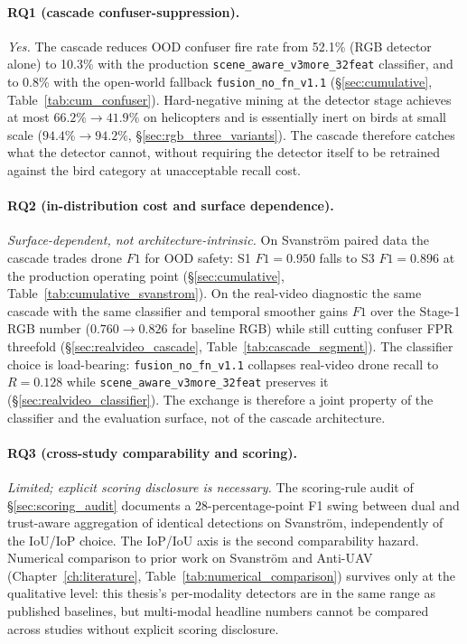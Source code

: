 \documentclass[12pt,a4paper,oneside,openright]{book}
\begin{document}
\paragraph{RQ1 (cascade confuser-suppression).}
\emph{Yes.} The cascade reduces OOD confuser fire rate from 52.1\% (RGB detector alone) to 10.3\% with the production \texttt{scene\_aware\_v3more\_32feat} classifier, and to 0.8\% with the open-world fallback \texttt{fusion\_no\_fn\_v1.1} (\S\ref{sec:cumulative}, Table~\ref{tab:cum_confuser}). Hard-negative mining at the detector stage achieves at most $66.2\% \to 41.9\%$ on helicopters and is essentially inert on birds at small scale ($94.4\% \to 94.2\%$, \S\ref{sec:rgb_three_variants}). The cascade therefore catches what the detector cannot, without requiring the detector itself to be retrained against the bird category at unacceptable recall cost.

\paragraph{RQ2 (in-distribution cost and surface dependence).}
\emph{Surface-dependent, not architecture-intrinsic.} On Svanstr\"om paired data the cascade trades drone $F1$ for OOD safety: S1 $F1=0.950$ falls to S3 $F1=0.896$ at the production operating point (\S\ref{sec:cumulative}, Table~\ref{tab:cumulative_svanstrom}). On the real-video diagnostic the same cascade with the same classifier and temporal smoother gains $F1$ over the Stage-1 RGB number ($0.760 \to 0.826$ for baseline RGB) while still cutting confuser FPR threefold (\S\ref{sec:realvideo_cascade}, Table~\ref{tab:cascade_segment}). The classifier choice is load-bearing: \texttt{fusion\_no\_fn\_v1.1} collapses real-video drone recall to $R=0.128$ while \texttt{scene\_aware\_v3more\_32feat} preserves it (\S\ref{sec:realvideo_classifier}). The exchange is therefore a joint property of the classifier and the evaluation surface, not of the cascade architecture.

\paragraph{RQ3 (cross-study comparability and scoring).}
\emph{Limited; explicit scoring disclosure is necessary.} The scoring-rule audit of \S\ref{sec:scoring_audit} documents a 28-percentage-point F1 swing between dual and trust-aware aggregation of identical detections on Svanstr\"om, independently of the IoU/IoP choice. The IoP/IoU axis is the second comparability hazard. Numerical comparison to prior work on Svanstr\"om and Anti-UAV (Chapter~\ref{ch:literature}, Table~\ref{tab:numerical_comparison}) survives only at the qualitative level: this thesis's per-modality detectors are in the same range as published baselines, but multi-modal headline numbers cannot be compared across studies without explicit scoring disclosure.
\end{document}
